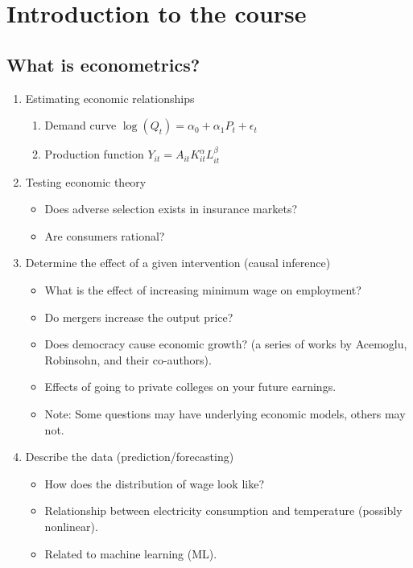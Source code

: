 \documentclass[]{book}
\providecommand{\tightlist}{%
  \setlength{\itemsep}{0pt}\setlength{\parskip}{0pt}}
\begin{document}
\chapter{Introduction to the course}\label{introduction-to-the-course}

\section{What is econometrics?}\label{what-is-econometrics}

\begin{enumerate}
\def\labelenumi{\arabic{enumi}.}
\tightlist
\item
  Estimating economic relationships

  \begin{enumerate}
  \def\labelenumii{\arabic{enumii}.}
  \tightlist
  \item
    Demand curve \(\log(Q_{t})= \alpha_0 + \alpha_1 P_t + \epsilon_t\)
  \item
    Production function \(Y_{it}=A_{it}K_{it}^{\alpha}L_{it}^{\beta}\)
  \end{enumerate}
\item
  Testing economic theory

  \begin{itemize}
  \tightlist
  \item
    Does adverse selection exists in insurance markets?
  \item
    Are consumers rational?
  \end{itemize}
\item
  Determine the effect of a given intervention (causal inference)

  \begin{itemize}
  \tightlist
  \item
    What is the effect of increasing minimum wage on employment?
  \item
    Do mergers increase the output price?
  \item
    Does democracy cause economic growth? (a series of works by
    Acemoglu, Robinsohn, and their co-authors).
  \item
    Effects of going to private colleges on your future earnings.
  \item
    Note: Some questions may have underlying economic models, others may
    not.
  \end{itemize}
\item
  Describe the data (prediction/forecasting)

  \begin{itemize}
  \tightlist
  \item
    How does the distribution of wage look like?
  \item
    Relationship between electricity consumption and temperature
    (possibly nonlinear).
  \item
    Related to machine learning (ML).
  \end{itemize}
\end{enumerate}
\end{document}
